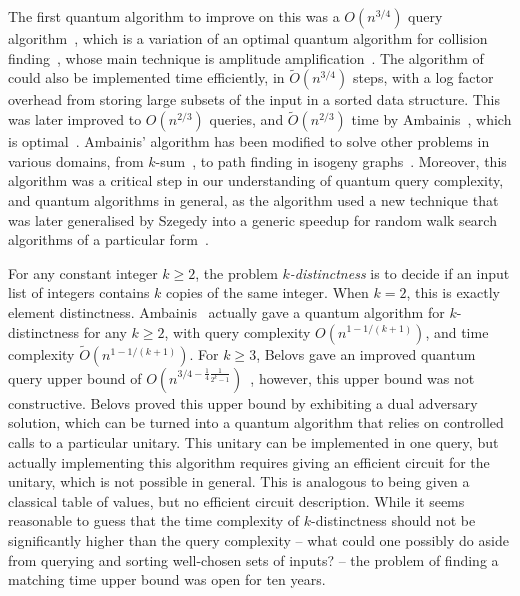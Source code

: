 \documentclass{article}
\renewcommand{\>}{\rangle}
\newcommand{\<}{\langle}
\renewcommand{\(}{\left(}
\renewcommand{\)}{\right)}
\begin{document}
The first quantum algorithm to improve on this was a $O(n^{3/4})$ query algorithm~\cite{buhrman2001ElementDistinctness}, which is a variation of an optimal quantum algorithm for collision finding~\cite{brassard1997collision}, whose main technique is amplitude amplification~\cite{brassard2002AmpAndEst}. The algorithm of~\cite{buhrman2001ElementDistinctness} could also be implemented time efficiently, in $\widetilde{O}(n^{3/4})$ steps, with a log factor overhead from storing large subsets of the input in a sorted data structure. This was later improved to $O(n^{2/3})$ queries, and $\widetilde{O}(n^{2/3})$ time by Ambainis~\cite{ambainis2004QWalkForElementDist}, which is optimal~\cite{aaronson2004QLowerBndCollisionAndElementDistinct}. Ambainis' algorithm has been modified to solve other problems in various domains, from $k$-sum~\cite{childs2005quantum}, to path finding in isogeny graphs~\cite{tani2009claw,
costello2016isogeny}. Moreover, this algorithm was a critical step in our understanding of quantum query complexity, and quantum algorithms in general, as the algorithm used a new technique that was later generalised by Szegedy into a generic speedup for random walk search algorithms of a particular form~\cite{szegedy2004QMarkovChainSearch}. 

For any constant integer $k\geq 2$, the problem \emph{$k$-distinctness} is to decide if an input list of integers contains $k$ copies of the same integer. When $k=2$, this is exactly element distinctness. Ambainis~\cite{ambainis2004QWalkForElementDist} actually gave a quantum algorithm for $k$-distinctness for any $k\geq 2$, with query complexity $O(n^{1-1/(k+1)})$, and time complexity $\widetilde{O}(n^{1-1/(k+1)})$. For $k\geq 3$, Belovs gave an improved quantum query upper bound of $O(n^{3/4-\frac{1}{4}\frac{1}{2^k-1}})$~\cite{belovs2012kDist}, however, this upper bound was not constructive. Belovs proved this upper bound by exhibiting a dual adversary solution, which can be turned into a quantum algorithm that relies on controlled calls to a particular unitary. This unitary can be implemented in one query, but actually implementing this algorithm requires giving an efficient circuit for the unitary, which is not possible in general. This is analogous to being given a classical table of values, but no efficient circuit description. While it seems reasonable to guess that the time complexity of $k$-distinctness should not be significantly higher than the query complexity -- what could one possibly do aside from querying and sorting well-chosen sets of inputs? -- the problem of finding a matching time upper bound was open for ten years. 
\end{document}
